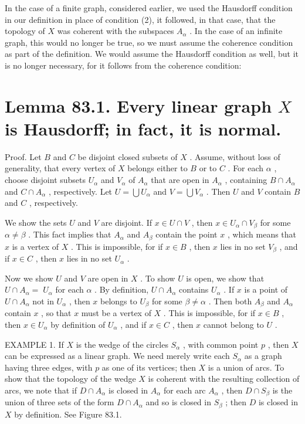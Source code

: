 \documentclass[10pt]{article}
\begin{document}
In the case of a finite graph, considered earlier, we used the Hausdorff condition in our definition in place of condition (2), it followed, in that case, that the topology of \(X\) was coherent with the subspaces \({A}_{\alpha }\) . In the case of an infinite graph, this would no longer be true, so we must assume the coherence condition as part of the definition. We would assume the Hausdorff condition as well, but it is no longer necessary, for it follows from the coherence condition:

\section*{Lemma 83.1. Every linear graph \(X\) is Hausdorff; in fact, it is normal.}

Proof. Let \(B\) and \(C\) be disjoint closed subsets of \(X\) . Assume, without loss of generality, that every vertex of \(X\) belongs either to \(B\) or to \(C\) . For each \(\alpha\) , choose disjoint subsets \({U}_{\alpha }\) and \({V}_{\alpha }\) of \({A}_{\alpha }\) that are open in \({A}_{\alpha }\) , containing \(B \cap  {A}_{\alpha }\) and \(C \cap  {A}_{\alpha }\) , respectively. Let \(U = \bigcup {U}_{\alpha }\) and \(V = \bigcup {V}_{\alpha }\) . Then \(U\) and \(V\) contain \(B\) and \(C\) , respectively.

We show the sets \(U\) and \(V\) are disjoint. If \(x \in  U \cap  V\) , then \(x \in  {U}_{\alpha } \cap  {V}_{\beta }\) for some \(\alpha  \neq  \beta\) . This fact implies that \({A}_{\alpha }\) and \({A}_{\beta }\) contain the point \(x\) , which means that \(x\) is a vertex of \(X\) . This is impossible, for if \(x \in  B\) , then \(x\) lies in no set \({V}_{\beta }\) , and if \(x \in  C\) , then \(x\) lies in no set \({U}_{\alpha }\) .

Now we show \(U\) and \(V\) are open in \(X\) . To show \(U\) is open, we show that \(U \cap  {A}_{\alpha } = \; {U}_{\alpha }\) for each \(\alpha\) . By definition, \(U \cap  {A}_{\alpha }\) contains \({U}_{\alpha }\) . If \(x\) is a point of \(U \cap  {A}_{\alpha }\) not in \({U}_{\alpha }\) , then \(x\) belongs to \({U}_{\beta }\) for some \(\beta  \neq  \alpha\) . Then both \({A}_{\beta }\) and \({A}_{\alpha }\) contain \(x\) , so that \(x\) must be a vertex of \(X\) . This is impossible, for if \(x \in  B\) , then \(x \in  {U}_{\alpha }\) by definition of \({U}_{\alpha }\) , and if \(x \in  C\) , then \(x\) cannot belong to \(U\) .

EXAMPLE 1. If \(X\) is the wedge of the circles \({S}_{\alpha }\) , with common point \(p\) , then \(X\) can be expressed as a linear graph. We need merely write each \({S}_{\alpha }\) as a graph having three edges, with \(p\) as one of its vertices; then \(X\) is a union of arcs. To show that the topology of the wedge \(X\) is coherent with the resulting collection of arcs, we note that if \(D \cap  {A}_{\alpha }\) is closed in \({A}_{\alpha }\) for each arc \({A}_{\alpha }\) , then \(D \cap  {S}_{\beta }\) is the union of three sets of the form \(D \cap  {A}_{\alpha }\) and so is closed in \({S}_{\beta }\) ; then \(D\) is closed in \(X\) by definition. See Figure 83.1.
\end{document}
